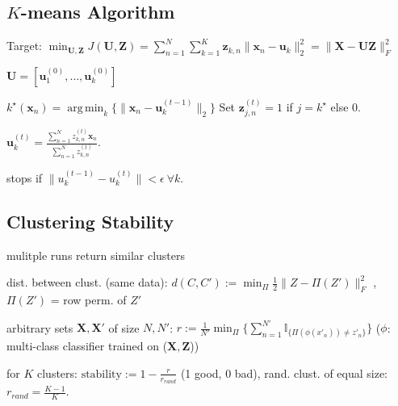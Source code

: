 \documentclass[a4paper, 11pt, landscape]{article}
\DeclareMathOperator*{\argmin}{arg\,min}
\begin{document}
\begin{multicols*}{3}
    \section{$K$-means Algorithm}
    \begin{inparadesc}
    \item[\color{red}Target:] $\min_{\mathbf{U}, \mathbf{Z}} J(\mathbf{U}, \mathbf{Z}) 
        = \sum_{n=1}^N \sum_{k=1}^K \mathbf{z}_{k,n} \|\mathbf{x}_n - \mathbf{u}_k\|_2^2 
        = \|\mathbf{X} - \mathbf{U} \mathbf{Z}\|_F^2 $
    \end{inparadesc}
    \begin{inparaenum}
    \item $\mathbf{U} = [\mathbf{u}_1^{(0)}, \ldots, \mathbf{u}_k^{(0)}]$ 
    \item $k^\star(\mathbf{x}_n) = \argmin_k \{ \|\mathbf{x}_n - \mathbf{u}_k^{(t-1)}\|_2 \}$ 
        Set $\mathbf{z}_{j,n}^{(t)} = 1$ if $j = k^\star$ else $0$.
    \item $\mathbf{u}_k^{(t)} = \frac{\sum_{n=1}^N z_{k,n}^{(t)} \mathbf{x}_n}{\sum_{n=1}^N z_{k,n}^{(t)}}$.
    \item stops if $\|u_k^{(t-1)} - u_k^{(t)}\| < \epsilon \ \forall k$.
    \end{inparaenum}

    \subsection{Clustering Stability}
    mulitple runs return similar clusters
    \begin{inparaitem}[\color{red}\textbullet]
    \item dist. between clust. (same data): $d(C,C') := \min_\Pi \frac{1}{2}\|Z-\Pi(Z')\|^2_F$ , $\Pi(Z
        ')$ = row perm. of $Z'$
    \item arbitrary sets $\mathbf{X},\mathbf{X'}$ of size $N,N'$: $r := \frac{1}{N'} \min_{\Pi} \{ \sum_{n=1}^{N'} \mathbb{I}_{\{\Pi(\phi(x'_n)) \neq z'_n\} } \}$ ($\phi$: multi-class classifier trained on ($\mathbf{X},\mathbf{Z}$))
    \item for $K$ clusters: $\text{stability} := 1 - \frac{r}{r_{rand}}$ (1 good, 0 bad), rand. clust. of equal size: $r_{rand} = \frac{K-1}{K}$.
    \end{inparaitem}


\end{multicols*}
\end{document}
